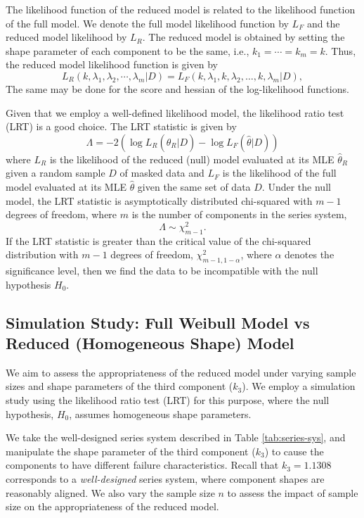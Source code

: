 \documentclass[11pt]{article}
\begin{document}
The likelihood function of the reduced model is related to the likelihood function of the full model. We denote the full model likelihood function by $L_F$ and the reduced model likelihood by $L_R$. The reduced model is obtained by setting the shape parameter of each component to be the same, i.e., $k_1 = \cdots = k_m = k$. Thus, the reduced model likelihood function is given by
$$
L_R(k, \lambda_1, \lambda_2, \cdots, \lambda_m | D) =
        L_F(k, \lambda_1, k, \lambda_2, \ldots, k, \lambda_m | D),
$$
The same may be done for the score and hessian of the log-likelihood functions.

Given that we employ a well-defined likelihood model, the likelihood ratio test (LRT) is a good choice. The LRT statistic is given by
$$
\Lambda = -2 (\log L_R(\hat\theta_R | D) - \log L_F(\hat\theta | D))
$$
where $L_R$ is the likelihood of the reduced (null) model evaluated at its MLE $\hat\theta_R$ given a random sample $D$ of masked data and $L_F$ is the likelihood of the full model evaluated at its MLE $\hat\theta$ given the same set of data $D$. Under the null model, the LRT statistic is asymptotically distributed chi-squared with $m-1$ degrees of freedom, where $m$ is the number of components in the series system,
$$
\Lambda \sim \chi^2_{m-1}.
$$
If the LRT statistic is greater than the critical value of the chi-squared distribution with $m-1$ degrees of freedom, $\chi^2_{m-1, 1-\alpha}$, where $\alpha$ denotes the significance level, then we find the data to be incompatible with the null hypothesis $H_0$.

\subsection{Simulation Study: Full Weibull Model vs Reduced (Homogeneous Shape) Model}
\label{full-vs-reduced}

We aim to assess the appropriateness of the reduced model under varying sample sizes and shape parameters of the third component ($k_3$). We employ a simulation study using the likelihood ratio test (LRT) for this purpose, where the null hypothesis, $H_0$, assumes homogeneous shape parameters.

We take the well-designed series system described in Table \ref{tab:series-sys}, and manipulate the shape parameter of the third component ($k_3$) to cause the components to have different failure characteristics. Recall that $k_3 = 1.1308$ corresponds to a \emph{well-designed} series system, where component shapes are reasonably aligned. We also vary the sample size $n$ to assess the impact of sample size on the appropriateness of the reduced model.
\end{document}
